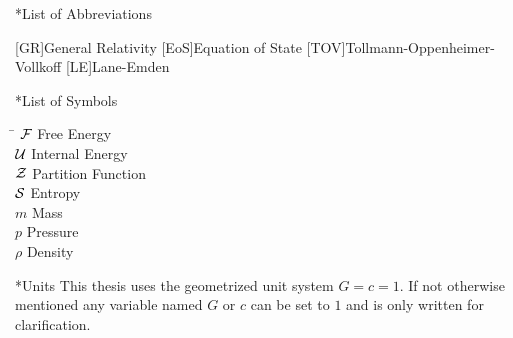 \thispagestyle{empty}
\begin{section}*{List of Abbreviations}

\begin{acronym}[TOV]
	[GR]{General Relativity}
	[EoS]{Equation of State}
	[TOV]{Tollmann-Oppenheimer-Vollkoff}
	[LE]{Lane-Emden}
\end{acronym}


\end{section}
\begin{section}*{List of Symbols}
\begin{tabbing}
\hspace{2cm}\=\kill
$\mathcal{F}$				\> Free Energy\\
$\mathcal{U}$				\> Internal Energy\\
$\mathcal{Z}$				\> Partition Function\\
$\mathcal{S}$				\> Entropy\\
$m$					\> Mass\\
$p$					\> Pressure\\
$\rho$				\> Density
\end{tabbing}

\end{section}

\begin{section}*{Units}
This thesis uses the geometrized unit system $G=c=1$.
If not otherwise mentioned any variable named $G$ or $c$ can be set to $1$ and is only written for clarification.
\end{section}

